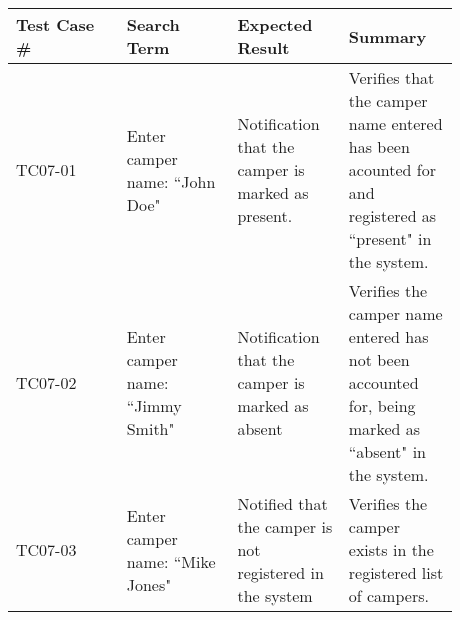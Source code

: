 \documentclass[11pt]{article}
\begin{document}
\begin{center}
\begin{longtable}{|p{0.22\linewidth}|p{0.22\linewidth}|p{0.22\linewidth}|p{0.22\linewidth}|}
	\hline
	Test Case \# & Search Term & Expected Result & Summary\\\hline
	TC07-01 & Enter camper name: ``John Doe" & Notification that the camper is marked as present. & Verifies that the camper name entered has been acounted for and registered as ``present" in the system.\vspace*{1em}\\\hline
	TC07-02 & Enter camper name: ``Jimmy Smith" & Notification that the camper is marked as absent& Verifies the camper name entered has not been accounted for, being marked as ``absent" in the system.\vspace*{1em}\\	\hline
	TC07-03 & Enter camper name: ``Mike Jones" & Notified that the camper is not registered in the system & Verifies the camper exists in the registered list of campers. \vspace*{1em}\\\hline
\end{longtable}
\end{center}
\clearpage
\end{document}
